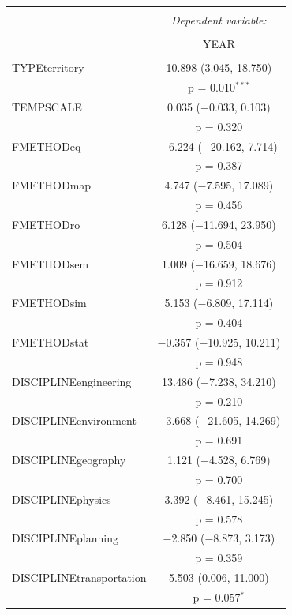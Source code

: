\begin{table}[!htbp]
  \appcaption{} 
\begin{tabular}{@{\extracolsep{5pt}}lc} 
\\[-1.8ex]\hline 
\hline \\[-1.8ex] 
 & \multicolumn{1}{c}{\textit{Dependent variable:}} \\ 
\cline{2-2} 
\\[-1.8ex] & YEAR \\ 
\hline \\[-1.8ex] 
 TYPEterritory & 10.898 (3.045, 18.750) \\ 
  & p = 0.010$^{***}$ \\ 
  TEMPSCALE & 0.035 ($-$0.033, 0.103) \\ 
  & p = 0.320 \\ 
  FMETHODeq & $-$6.224 ($-$20.162, 7.714) \\ 
  & p = 0.387 \\ 
  FMETHODmap & 4.747 ($-$7.595, 17.089) \\ 
  & p = 0.456 \\ 
  FMETHODro & 6.128 ($-$11.694, 23.950) \\ 
  & p = 0.504 \\ 
  FMETHODsem & 1.009 ($-$16.659, 18.676) \\ 
  & p = 0.912 \\ 
  FMETHODsim & 5.153 ($-$6.809, 17.114) \\ 
  & p = 0.404 \\ 
  FMETHODstat & $-$0.357 ($-$10.925, 10.211) \\ 
  & p = 0.948 \\ 
  DISCIPLINEengineering & 13.486 ($-$7.238, 34.210) \\ 
  & p = 0.210 \\ 
  DISCIPLINEenvironment & $-$3.668 ($-$21.605, 14.269) \\ 
  & p = 0.691 \\ 
  DISCIPLINEgeography & 1.121 ($-$4.528, 6.769) \\ 
  & p = 0.700 \\ 
  DISCIPLINEphysics & 3.392 ($-$8.461, 15.245) \\ 
  & p = 0.578 \\ 
  DISCIPLINEplanning & $-$2.850 ($-$8.873, 3.173) \\ 
  & p = 0.359 \\ 
  DISCIPLINEtransportation & 5.503 (0.006, 11.000) \\ 
  & p = 0.057$^{*}$ \\ 

\end{tabular}
\end{table}
